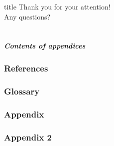 \documentclass[%
aspectratio=169,%
xcolor=table,%
]{beamer}
\begin{document}
 
    \begin{frame}
        [%
            endframe,
        ]%
        \centering
        \vfill
        \begin{beamercolorbox}[sep=4pt,center,rounded=true,shadow=true]{title}
            Thank you for your attention!\\
            Any questions?
        \end{beamercolorbox}
        \vfill\vfill
        \inserttitlegraphic
    \end{frame}


    \backupbegin

    \part{}
    \begin{frame}
        \frametitle{Contents of appendices}
        \tableofcontents
    \end{frame}

    \section{References}
    

    \section{Glossary}
    
    \section{Appendix}
    
    \section{Appendix 2}
    

    \backupend
 
\end{document}
